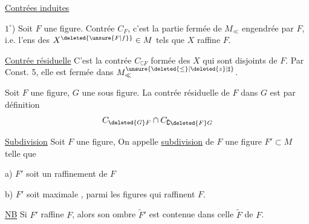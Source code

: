 \uline{Contrées induites}

$1^\circ$) Soit $F$ une figure. Contrée  $C_F$,  c'est la partie fermée de $M_{\ll}$ engendrée par $F$, i.e. l'ens des $X^{\deleted{\unsure{F|f}}}\in M$ tels que $X$ raffine $F$.

\uline{Contrée résiduelle} C'est la  contrée $C_{\complement F}$  formée des $X$  qui sont disjoints de $F$. Par Const. 5, elle est   fermée dans $M^{\unsure{\deleted{\leq}|\deleted{z}|\sharp}}_{\ll}$.

 Soit $F$ une figure, $G$ une  sous figure. La contrée résiduelle de $F$ dans $G$ est par définition
\[
 C_{\deleted{G}F}\cap C_{\complement\deleted{F}G}
\]

\uline{Subdivision} Soit $F$  une figure,  On appelle \uline{subdivision} de $F$ une figure $F'\subset M$ telle que

a) $F'$ soit un raffinement de $F$

b) $F'$ soit maximale , parmi les  figures qui raffinent $F$.

\uline{NB} Si $F'$ raffine $F$, alors son ombre $\widetilde F'$ est contenue dans celle $\widetilde F$ de $F$.
